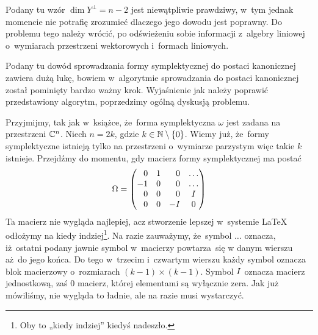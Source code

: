 \documentclass[a4paper,11pt]{article}
\begin{document}
\vspace{\spaceFour}





 Podany tu wzór $\dim Y^{ \perp } = n - 2$ jest niewątpliwie
prawdziwy, w~tym jednak momencie nie potrafię zrozumieć dlaczego jego
dowodu jest poprawny. Do problemu tego należy wrócić, po odświeżeniu sobie
informacji z~algebry liniowej o~wymiarach przestrzeni wektorowych i~formach
liniowych.

\vspace{\spaceFour}



 Podany tu dowód sprowadzania formy symplektycznej do
postaci kanonicznej zawiera dużą lukę, bowiem w~algorytmie sprowadzania do
postaci kanonicznej został pominięty bardzo ważny krok. Wyjaśnienie jak
należy poprawić przedstawiony algorytm, poprzedzimy ogólną dyskusją
problemu.

Przyjmijmy, tak jak w~książce, że~forma symplektyczna $\omega$ jest zadana na
przestrzeni $\mathbb{C}^{ n }$. Niech $n = 2k$, gdzie $k \in \mathbb{N} \setminus \{ 0 \}$. Wiemy
już, że~formy symplektyczne istnieją tylko na przestrzeni o~wymiarze
parzystym więc takie $k$ istnieje. Przejdźmy do momentu, gdy macierz formy symplektycznej ma postać
\begin{equation}
  \label{eq:Wojtynski-13}
  \Omega =
  \begin{pmatrix}
    \hphantom{-} 0 & 1 & \hphantom{-} 0 & \ldots \\
    -1 & 0 & \hphantom{-} 0 & \ldots \\
    \hphantom{-} 0 & 0 & \hphantom{-} 0 & I \\
    \hphantom{-} 0 & 0 & -I & 0 \\
  \end{pmatrix}
\end{equation}
Ta macierz nie wygląda najlepiej, acz stworzenie lepszej w~systemie \LaTeX{}
odłożymy na kiedy indziej\footnote{Oby to „kiedy indziej” kiedyś nadeszło.}.
Na razie zauważymy, że~symbol $\ldots$ oznacza, iż~ostatni podany jawnie symbol
w~macierzy powtarza~się w danym wierszu aż~do jego końca. Do tego w~trzecim
i~czwartym wierszu każdy symbol oznacza blok macierzowy o~rozmiarach
$( k - 1 ) \times ( k - 1 )$. Symbol $I$ oznacza macierz jednostkową, zaś
$0$ macierz, której elementami są wyłącznie zera. Jak już mówiliśmy, nie
wygląda to ładnie, ale na razie musi wystarczyć.
\end{document}

